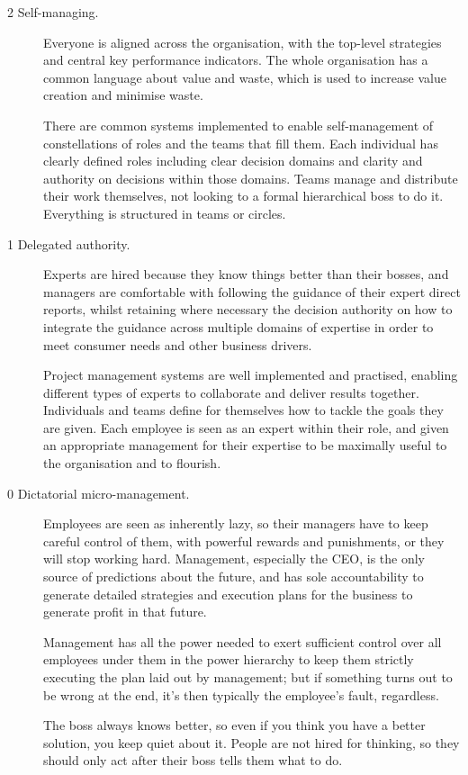 \begin{description}
\item[2 Self-managing.]  
Everyone is aligned across the organisation, with the top-level strategies and central key performance indicators. The whole organisation has a common language about value and waste, which is used to increase value creation and minimise waste. 


There are common systems implemented to enable self-management of constellations of roles and the teams that fill them. Each individual has clearly defined roles including clear decision domains and clarity and authority on decisions within those domains. Teams manage and distribute their work themselves, not looking to a formal hierarchical boss to do it. Everything is structured in teams or circles.


\item[1 Delegated authority.]  
Experts are hired because they know things better than their bosses, and managers are comfortable with following the guidance of their expert direct reports, whilst retaining where necessary the decision authority on how to integrate the guidance across multiple domains of expertise in order to meet consumer needs and other business drivers. 


Project management systems are well implemented and practised, enabling different types of experts to collaborate and deliver results together. Individuals and teams define for themselves how to tackle the goals they are given. Each employee is seen as an expert within their role, and given an appropriate management for their expertise to be maximally useful to the organisation and to flourish.


\item[0 Dictatorial micro-management.]  
Employees are seen as inherently lazy, so their managers have to keep careful control of them, with powerful rewards and punishments, or they will stop working hard. Management, especially the CEO, is the only source of predictions about the future, and has sole accountability to generate detailed strategies and execution plans for the business to generate profit in that future. 


Management has all the power needed to exert sufficient control over all employees under them in the power hierarchy to keep them strictly executing the plan laid out by management; but if something turns out to be wrong at the end, it's then typically the employee’s fault, regardless. 


The boss always knows better, so even if you think you have a better solution, you keep quiet about it. People are not hired for thinking, so they should only act after their boss tells them what to do.
\end{description}


